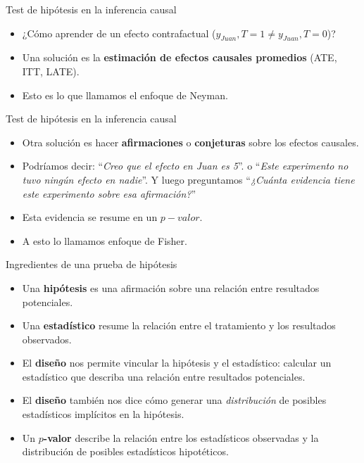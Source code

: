 \documentclass[
  ignorenonframetext,
]{beamer}
\begin{document}
\begin{frame}{Test de hipótesis en la inferencia causal}
\protect\hypertarget{test-de-hipuxf3tesis-en-la-inferencia-causal}{}
\begin{itemize}
\item
  ¿Cómo aprender de un efecto contrafactual
  (\(y_{Juan},T=1 \neq y_{Juan},T=0\))?
\item
  Una solución es la \textbf{estimación de efectos causales promedios}
  (ATE, ITT, LATE).
\item
  Esto es lo que llamamos el enfoque de Neyman.
\end{itemize}
\end{frame}

\begin{frame}{Test de hipótesis en la inferencia causal}
\protect\hypertarget{test-de-hipuxf3tesis-en-la-inferencia-causal-1}{}
\begin{itemize}
\item
  Otra solución es hacer \textbf{afirmaciones} o \textbf{conjeturas}
  sobre los efectos causales.
\item
  Podríamos decir: ``\emph{Creo que el efecto en Juan es 5}''. o
  ``\emph{Este experimento no tuvo ningún efecto en nadie}''. Y luego
  preguntamos ``\emph{¿Cuánta evidencia tiene este experimento sobre esa
  afirmación?}''
\item
  Esta evidencia se resume en un \(p-valor\).
\item
  A esto lo llamamos enfoque de Fisher.
\end{itemize}
\end{frame}

\begin{frame}{Ingredientes de una prueba de hipótesis}
\protect\hypertarget{ingredientes-de-una-prueba-de-hipuxf3tesis}{}
\begin{itemize}
\item
  Una \textbf{hipótesis} es una afirmación sobre una relación entre
  resultados potenciales.
\item
  Una \textbf{estadístico} resume la relación entre el tratamiento y los
  resultados observados.
\item
  El \textbf{diseño} nos permite vincular la hipótesis y el estadístico:
  calcular un estadístico que describa una relación entre resultados
  potenciales.
\item
  El \textbf{diseño} también nos dice cómo generar una
  \emph{distribución} de posibles estadísticos implícitos en la
  hipótesis.
\item
  Un \textbf{\(p\)-valor} describe la relación entre los estadísticos
  observadas y la distribución de posibles estadísticos hipotéticos.
\end{itemize}
\end{frame}
\end{document}
